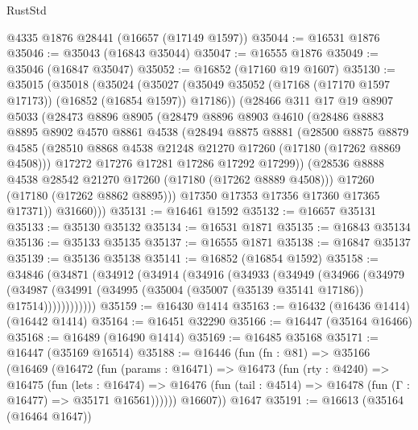 \begin{lexlean}{RustStd}
\begin{coremodule}
    @4335
    @1876
    @28441
    (@16657 (@17149 @1597))
@35044 := @16531 @1876
@35046 := @35043 (@16843 @35044)
@35047 := @16555 @1876
@35049 := @35046 (@16847 @35047)
@35052 := @16852 (@17160 @19 @1607)
@35130 := @35015
    (@35018
      (@35024
        (@35027 (@35049 @35052 (@17168 (@17170 @1597 @17173)) (@16852 (@16854 @1597)) @17186))
        (@28466
          @311
          @17
          @19
          @8907
          @5033
          (@28473
            @8896
            @8905
            (@28479
              @8896
              @8903
              @4610
              (@28486
                @8883
                @8895
                @8902
                @4570
                @8861
                @4538
                (@28494
                  @8875
                  @8881
                  (@28500
                    @8875
                    @8879
                    @4585
                    (@28510 @8868 @4538 @21248 @21270 @17260 (@17180 (@17262 @8869 @4508)))
                    @17272
                    @17276
                    @17281
                    @17286
                    @17292
                    @17299))
                (@28536 @8888 @4538 @28542 @21270 @17260 (@17180 (@17262 @8889 @4508)))
                @17260
                (@17180 (@17262 @8862 @8895)))
              @17350
              @17353
              @17356
              @17360
              @17365
              @17371))
          @31660)))
@35131 := @16461 @1592
@35132 := @16657 @35131
@35133 := @35130 @35132
@35134 := @16531 @1871
@35135 := @16843 @35134
@35136 := @35133 @35135
@35137 := @16555 @1871
@35138 := @16847 @35137
@35139 := @35136 @35138
@35141 := @16852 (@16854 @1592)
@35158 := @34846
    (@34871
      (@34912
        (@34914
          (@34916
            (@34933
              (@34949
                (@34966
                  (@34979
                    (@34987
                      (@34991 (@34995 (@35004 (@35007 (@35139 @35141 @17186)) @17514))))))))))))
@35159 := @16430 @1414
@35163 := @16432 (@16436 @1414) (@16442 @1414)
@35164 := @16451 @32290
@35166 := @16447 (@35164 @16466)
@35168 := @16489 (@16490 @1414)
@35169 := @16485 @35168
@35171 := @16447 (@35169 @16514)
@35188 := @16446
    (fun (fn : @81) =>
    @35166
      (@16469
        (@16472
          (fun (params : @16471) =>
          @16473
            (fun (rty : @4240) =>
            @16475
              (fun (lets : @16474) =>
              @16476 (fun (tail : @4514) => @16478 (fun (Γ : @16477) => @35171 @16561))))))
        @16607))
    @1647
@35191 := @16613 (@35164 (@16464 @1647))

\end{coremodule}
\end{lexlean}
